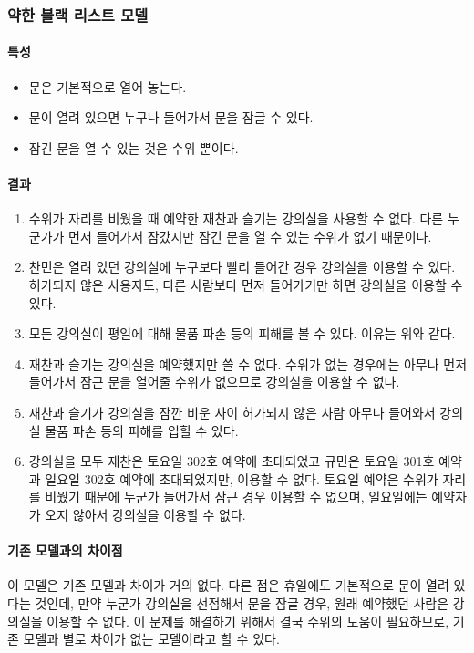 \documentclass[11pt,a4paper]{article}
\begin{document}
\subsubsection{약한 블랙 리스트 모델}

\paragraph{특성}
\begin{itemize}
\item 문은 기본적으로 열어 놓는다.
\item 문이 열려 있으면 누구나 들어가서 문을 잠글 수 있다.
\item 잠긴 문을 열 수 있는 것은 수위 뿐이다.
\end{itemize}

\paragraph{결과}
\begin{enumerate}
\item 수위가 자리를 비웠을 때 예약한 재찬과 슬기는 강의실을 사용할 수 없다. 다른 누군가가 먼저 들어가서 잠갔지만 잠긴 문을 열 수 있는 수위가 없기 때문이다.
\item 찬민은 열려 있던 강의실에 누구보다 빨리 들어간 경우 강의실을 이용할 수 있다. 허가되지 않은 사용자도, 다른 사람보다 먼저 들어가기만 하면 강의실을 이용할 수 있다.
\item 모든 강의실이 평일에 대해 물품 파손 등의 피해를 볼 수 있다. 이유는 위와 같다.
\item 재찬과 슬기는 강의실을 예약했지만 쓸 수 없다. 수위가 없는 경우에는 아무나 먼저 들어가서 잠근 문을 열어줄 수위가 없으므로 강의실을 이용할 수 없다.
\item 재찬과 슬기가 강의실을 잠깐 비운 사이 허가되지 않은 사람 아무나 들어와서 강의실 물품 파손 등의 피해를 입힐 수 있다.
\item 강의실을 모두 재찬은 토요일 302호 예약에 초대되었고 규민은 토요일 301호 예약과 일요일 302호 예약에 초대되었지만, 이용할 수 없다. 토요일 예약은 수위가 자리를 비웠기 때문에 누군가 들어가서 잠근 경우 이용할 수 없으며, 일요일에는 예약자가 오지 않아서 강의실을 이용할 수 없다.
\end{enumerate}

\paragraph{기존 모델과의 차이점}
\hfill\break
이 모델은 기존 모델과 차이가 거의 없다. 다른 점은 휴일에도 기본적으로 문이 열려 있다는 것인데, 만약 누군가 강의실을 선점해서 문을 잠글 경우, 원래 예약했던 사람은 강의실을 이용할 수 없다. 이 문제를 해결하기 위해서 결국 수위의 도움이 필요하므로, 기존 모델과 별로 차이가 없는 모델이라고 할 수 있다.
\end{document}
